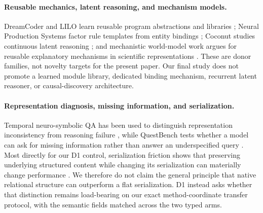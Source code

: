 \paragraph{Reusable mechanics, latent reasoning, and mechanism models.}
DreamCoder and LILO learn reusable program abstractions and libraries \citep{ellis2020dreamcoder,grand2023lilo}; Neural Production Systems factor rule templates from entity bindings \citep{goyal2021nps}; Coconut studies continuous latent reasoning \citep{hao2024coconut}; and mechanistic world-model work argues for reusable explanatory mechanisms in scientific representations \citep{posner2026mwm}. These are donor families, not novelty targets for the present paper. Our final study does not promote a learned module library, dedicated binding mechanism, recurrent latent reasoner, or causal-discovery architecture.

\paragraph{Representation diagnosis, missing information, and serialization.}
Temporal neuro-symbolic QA has been used to distinguish representation inconsistency from reasoning failure \citep{liem2026temporal}, while QuestBench tests whether a model can ask for missing information rather than answer an underspecified query \citep{li2025questbench}. Most directly for our D1 control, serialization friction shows that preserving underlying structured content while changing its serialization can materially change performance \citep{lo2026serialization}. We therefore do not claim the general principle that native relational structure can outperform a flat serialization. D1 instead asks whether that distinction remains load-bearing on our exact method-coordinate transfer protocol, with the semantic fields matched across the two typed arms.
